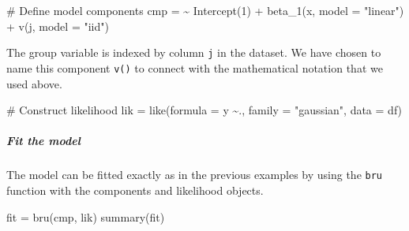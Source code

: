 \documentclass[
  letterpaper,
  DIV=11,
  numbers=noendperiod]{scrartcl}
\let\oldsubparagraph\subparagraph
\renewcommand{\subparagraph}[1]{\oldsubparagraph{#1}\mbox{}}
\newenvironment{Shaded}{\begin{snugshade}}{\end{snugshade}}
\newcommand{\AttributeTok}[1]{\textcolor[rgb]{0.40,0.45,0.13}{#1}}
\newcommand{\CommentTok}[1]{\textcolor[rgb]{0.37,0.37,0.37}{#1}}
\newcommand{\DecValTok}[1]{\textcolor[rgb]{0.68,0.00,0.00}{#1}}
\newcommand{\ErrorTok}[1]{\textcolor[rgb]{0.68,0.00,0.00}{#1}}
\newcommand{\FunctionTok}[1]{\textcolor[rgb]{0.28,0.35,0.67}{#1}}
\newcommand{\NormalTok}[1]{\textcolor[rgb]{0.00,0.23,0.31}{#1}}
\newcommand{\OtherTok}[1]{\textcolor[rgb]{0.00,0.23,0.31}{#1}}
\newcommand{\SpecialCharTok}[1]{\textcolor[rgb]{0.37,0.37,0.37}{#1}}
\newcommand{\StringTok}[1]{\textcolor[rgb]{0.13,0.47,0.30}{#1}}
\begin{document}
\begin{Shaded}
\begin{Highlighting}[]
\CommentTok{\# Define model components}
\NormalTok{cmp }\OtherTok{=}  \ErrorTok{\textasciitilde{}} \FunctionTok{Intercept}\NormalTok{(}\DecValTok{1}\NormalTok{) }\SpecialCharTok{+} \FunctionTok{beta\_1}\NormalTok{(x, }\AttributeTok{model =} \StringTok{"linear"}\NormalTok{) }\SpecialCharTok{+}
  \FunctionTok{v}\NormalTok{(j, }\AttributeTok{model =} \StringTok{"iid"}\NormalTok{)}
\end{Highlighting}
\end{Shaded}

The group variable is indexed by column \texttt{j} in the dataset. We
have chosen to name this component \texttt{v()} to connect with the
mathematical notation that we used above.

\begin{Shaded}
\begin{Highlighting}[]
\CommentTok{\# Construct likelihood}
\NormalTok{lik }\OtherTok{=}  \FunctionTok{like}\NormalTok{(}\AttributeTok{formula =}\NormalTok{ y }\SpecialCharTok{\textasciitilde{}}\NormalTok{.,}
            \AttributeTok{family =} \StringTok{"gaussian"}\NormalTok{,}
            \AttributeTok{data =}\NormalTok{ df)}
\end{Highlighting}
\end{Shaded}

\subparagraph{\texorpdfstring{\textbf{\emph{Fit the
model}}}{Fit the model}}\label{fit-the-model}

The model can be fitted exactly as in the previous examples by using the
\texttt{bru} function with the components and likelihood objects.

\begin{Shaded}
\begin{Highlighting}[]
\NormalTok{fit }\OtherTok{=} \FunctionTok{bru}\NormalTok{(cmp, lik)}
\FunctionTok{summary}\NormalTok{(fit)}
\end{Highlighting}
\end{Shaded}
\end{document}
